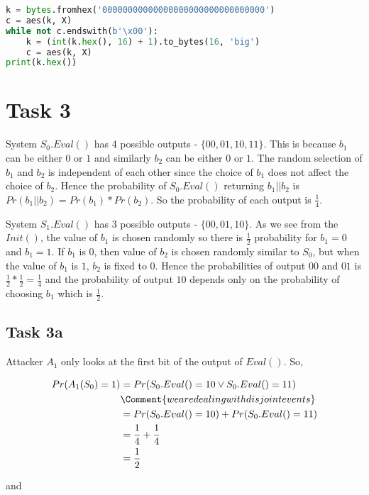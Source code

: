 \documentclass{article}
\begin{document}
    \begin{lstlisting}[language=Python]
k = bytes.fromhex('00000000000000000000000000000000')
c = aes(k, X)
while not c.endswith(b'\x00'):
    k = (int(k.hex(), 16) + 1).to_bytes(16, 'big')
    c = aes(k, X)
print(k.hex())
    \end{lstlisting}

    \section*{Task 3}
    System $S_0.Eval()$ has 4 possible outputs - $\{00, 01, 10, 11\}$. This is because $b_1$ can be either $0$ or $1$ and similarly $b_2$ can be either $0$ or $1$. The random selection of $b_1$ and $b_2$ is independent of each other since the choice of $b_1$ does not affect the choice of $b_2$. Hence the probability of $S_0.Eval()$ returning $b_1 || b_2$ is $Pr(b_1 || b_2) = Pr(b_1) * Pr(b_2)$. So the probability of each output is $\frac{1}{4}$.

    System $S_1.Eval()$ has 3 possible outputs - $\{00, 01, 10\}$. As we see from the $Init()$, the value of $b_1$ is chosen randomly so there is $\frac{1}{2}$ probability for $b_1 = 0$ and $b_1 = 1$. If $b_1$ is $0$, then value of $b_2$ is chosen randomly similar to $S_0$, but when the value of $b_1$ is $1$, $b_2$ is fixed to $0$. Hence the probabilities of output $00$ and $01$ is $\frac{1}{2} * \frac{1}{2} = \frac{1}{4}$ and the probability of output $10$ depends only on the probability of choosing $b_1$ which is $\frac{1}{2}$.

    \subsection*{Task 3a}
    Attacker $A_1$ only looks at the first bit of the output of $Eval()$. So, 

    \begin{align*}
        Pr(A_1(S_0) = 1)    & = Pr(S_0.Eval() = 10 \lor S_0.Eval() = 11) \\
                            & \Comment{we are dealing with disjoint events} \\
                            & = Pr(S_0.Eval() = 10) + Pr(S_0.Eval() = 11) \\
                            & = \frac{1}{4} + \frac{1}{4} \\
                            & = \frac{1}{2}
    \end{align*}

    and
\end{document}
